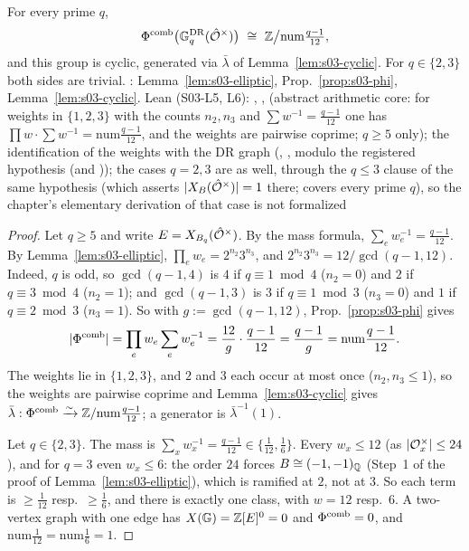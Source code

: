 \begin{proposition}\label{prop:s03-mazur}
For every prime $q$,
\[\Phicomb\big(\GDR_q(\hat\cO^\times)\big)\ \cong\ \Z\big/\mathrm{num}\tfrac{q-1}{12},\]
and this group is cyclic, generated via $\bar\lambda$ of Lemma~\ref{lem:s03-cyclic}. For $q\in\{2,3\}$ both sides are trivial.
\stpmc: Lemma~\ref{lem:s03-elliptic}, Prop.~\ref{prop:s03-phi}, Lemma~\ref{lem:s03-cyclic}. Lean (S03-L5, L6):
, , 
\stformal{} (abstract arithmetic core: for weights in $\{1,2,3\}$ with the counts $n_2,n_3$ and $\sum w^{-1}=\frac{q-1}{12}$ one has
$\prod w\cdot\sum w^{-1}=\mathrm{num}\frac{q-1}{12}$, and the weights are pairwise coprime; $q\ge5$ only); the identification of the weights with the DR graph
(, , \stformal{} modulo the registered hypothesis  (and )); the cases $q=2,3$ are \stformal{} as well, through the $q\le3$ clause of the same hypothesis  (which asserts $|X_B(\hat{\mathcal{O}}^\times)|=1$ there;  covers every prime $q$), so the chapter's elementary derivation of that case is not formalized
\end{proposition}
\begin{proof}
Let $q\ge5$ and write $E=X_{B_q}(\hat{\mathcal{O}}^\times)$. By the mass formula, $\sum_e w_e^{-1}=\frac{q-1}{12}$. By Lemma~\ref{lem:s03-elliptic},
$\prod_ew_e=2^{n_2}3^{n_3}$, and $2^{n_2}3^{n_3}=12/\gcd(q-1,12)$. Indeed, $q$ is odd, so $\gcd(q-1,4)$ is $4$ if $q\equiv1\bmod4$ ($n_2=0$) and
$2$ if $q\equiv3\bmod4$ ($n_2=1$); and $\gcd(q-1,3)$ is $3$ if $q\equiv1\bmod3$ ($n_3=0$) and $1$ if $q\equiv2\bmod3$ ($n_3=1$). So with
$g:=\gcd(q-1,12)$, Prop.~\ref{prop:s03-phi} gives
\[|\Phi^{\mathrm{comb}}|=\prod_ew_e\sum_ew_e^{-1}=\frac{12}g\cdot\frac{q-1}{12}=\frac{q-1}g=\mathrm{num}\frac{q-1}{12}.\]
The weights lie in $\{1,2,3\}$, and $2$ and $3$ each occur at most once ($n_2,n_3\le1$), so the weights are pairwise coprime and
Lemma~\ref{lem:s03-cyclic} gives $\bar\lambda:\Phi^{\mathrm{comb}}\xrightarrow\sim\mathbb{Z}/\mathrm{num}\frac{q-1}{12}$; a generator is $\bar\lambda^{-1}(1)$.

Let $q\in\{2,3\}$. The mass is $\sum_xw_x^{-1}=\frac{q-1}{12}\in\{\frac1{12},\frac16\}$. Every $w_x\le12$ (as $|\mathcal{O}_x^\times|\le24$), and for $q=3$
even $w_x\le6$: the order $24$ forces $B\cong(-1,-1)_{\mathbb{Q}}$ (Step~1 of the proof of Lemma~\ref{lem:s03-elliptic}), which is ramified at $2$, not at $3$.
So each term is $\ge\frac1{12}$ resp.\ $\ge\frac16$, and there is exactly one class, with $w=12$ resp.\ $6$. A two-vertex graph with one edge has
$X(\mathbb{G})=\mathbb{Z}[E]^0=0$ and $\Phi^{\mathrm{comb}}=0$, and $\mathrm{num}\frac1{12}=\mathrm{num}\frac16=1$.
\end{proof}

